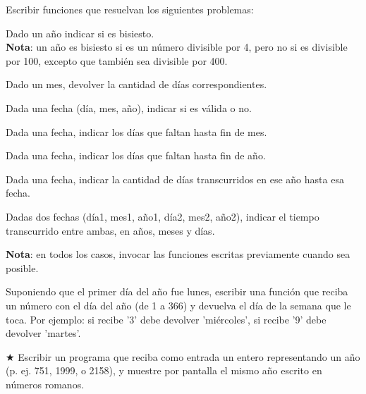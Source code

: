 \begin{ejercicio} Escribir funciones que resuelvan los siguientes problemas:
\begin{partes}
    \item Dado un año indicar si es bisiesto. \\
{\bf Nota}: un año es bisiesto si es un número divisible por 4, pero no si es
divisible por 100, excepto que también sea divisible por 400.

    \item Dado un mes, devolver la cantidad de días correspondientes.

    \item Dada una fecha (día, mes, año), indicar si es válida o no.

    \item Dada una fecha, indicar los días que faltan hasta fin de mes.

    \item Dada una fecha, indicar los días que faltan hasta fin de año.

    \item Dada una fecha, indicar la cantidad de días transcurridos en ese año
hasta esa fecha.

    \item Dadas dos fechas (día1, mes1, año1, día2, mes2, año2), indicar el
tiempo transcurrido entre ambas, en años, meses y días.
\end{partes}
{\bf Nota}: en todos los casos, invocar las funciones escritas previamente
cuando sea posible.
\end{ejercicio}


\begin{ejercicio}
Suponiendo que el primer día del año fue lunes, escribir una función
que reciba un número con el día del año (de 1 a 366) y devuelva el día
de la semana que le toca. Por ejemplo: si recibe '3' debe devolver
'miércoles', si recibe '9' debe devolver 'martes'.
\end{ejercicio}


\begin{ejercicio}
$\bigstar$ Escribir un programa que reciba como entrada un entero representando un año
(p. ej. 751, 1999, o 2158), y muestre por pantalla el mismo año escrito en
números romanos.
\end{ejercicio}


